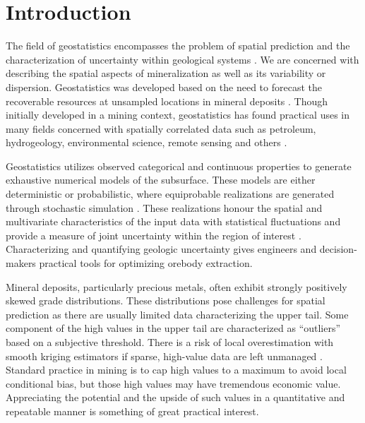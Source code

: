 
\chapter{Introduction}
\label{ch:01intro}

The field of geostatistics encompasses the problem of spatial prediction and the characterization of uncertainty within geological systems \citep{deutsch1992geostatistical}. We are concerned with describing the spatial aspects of mineralization as well as its variability or dispersion. Geostatistics was developed based on the need to forecast the recoverable resources at unsampled locations in mineral deposits \citep{matheron1963principles}. Though initially developed in a mining context, geostatistics has found practical uses in many fields concerned with spatially correlated data such as petroleum, hydrogeology, environmental science, remote sensing and others \citep{goovaerts1997geostatistics}.

Geostatistics utilizes observed categorical and continuous properties to generate exhaustive numerical models of the subsurface. These models are either deterministic or probabilistic, where equiprobable realizations are generated through stochastic simulation \citep{chiles2012geostatistics}. These realizations honour the spatial and multivariate characteristics of the input data with statistical fluctuations and provide a measure of joint uncertainty within the region of interest \citep{rossi2013mineral}. Characterizing and quantifying geologic uncertainty gives engineers and decision-makers practical tools for optimizing orebody extraction.

Mineral deposits, particularly precious metals, often exhibit strongly positively skewed grade distributions. These distributions pose challenges for spatial prediction as there are usually limited data characterizing the upper tail. Some component of the high values in the upper tail are characterized as ``outliers'' based on a subjective threshold. There is a risk of local overestimation with smooth kriging estimators if sparse, high-value data are left unmanaged \citep{leuangthong2015dealing}. Standard practice in mining is to cap high values to a maximum to avoid local conditional bias, but those high values may have tremendous economic value. Appreciating the potential and the upside of such values in a quantitative and repeatable manner is something of great practical interest.

